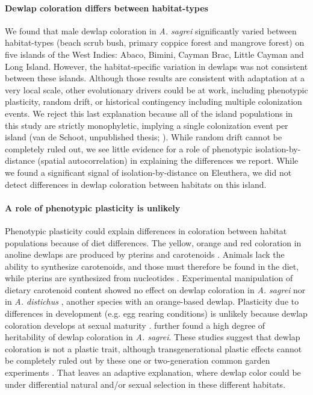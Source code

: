 

\paragraph{Dewlap coloration differs between habitat-types} We found that male dewlap coloration in \textit{A. sagrei} significantly varied between habitat-types (beach scrub bush, primary coppice forest and mangrove forest) on five islands of the West Indies: Abaco, Bimini, Cayman Brac, Little Cayman and Long Island. However, the habitat-specific variation in dewlaps was not consistent between these islands. Although those results are consistent with adaptation at a very local scale, other evolutionary drivers could be at work, including phenotypic plasticity, random drift, or historical contingency including multiple colonization events. We reject this last explanation because all of the island populations in this study are strictly monophyletic, implying a single colonization event per island (van de Schoot, unpublished thesis; \citealt{Driessens2017}). While random drift cannot be completely ruled out, we see little evidence for a role of phenotypic isolation-by-distance (spatial autocorrelation) in explaining the differences we report. While we found a significant signal of isolation-by-distance on Eleuthera, we did not detect differences in dewlap coloration between habitats on this island.


\paragraph{A role of phenotypic plasticity is unlikely} Phenotypic plasticity could explain differences in coloration between habitat populations because of diet differences. The yellow, orange and red coloration in anoline dewlaps are produced by pterins and carotenoids \citep{Ortiz1962, Ortiz1962a, Ortiz1963, Ortiz1966, Macedonia2000, Steffen2007, Steffen2009}. Animals lack the ability to synthesize carotenoids, and those must therefore be found in the diet, while pterins are synthesized from nucleotides \citep{Goodwin1984, Hill2002, Hill2006}. Experimental manipulation of dietary carotenoid content showed no effect on dewlap coloration in \textit{A. sagrei} \citep{Steffen2010} nor in \textit{A. distichus} \citep{Ng2013}, another species with an orange-based dewlap. Plasticity due to differences in development (e.g. egg rearing conditions) is unlikely because dewlap coloration develops at sexual maturity \citep{Ng2013}. \citet{Cox2017} further found a high degree of heritability of dewlap coloration in \textit{A. sagrei}. These studies suggest that dewlap coloration is not a plastic trait, although transgenerational plastic effects cannot be completely ruled out by these one or two-generation common garden experiments \citep{Tariel2020}. That leaves an adaptive explanation, where dewlap color could be under differential natural and/or sexual selection in these different habitats.

